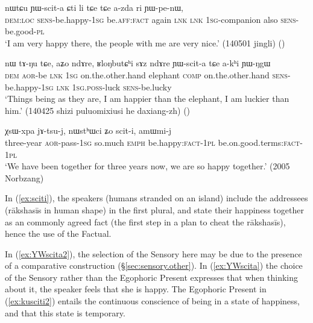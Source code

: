 \begin{exe}
\ex \label{ex:YWscita}
\gll nɯtɕu ɲɯ-scit-a ɕti li tɕe tɕe a-zda ri ɲɯ-pe-nɯ, \\
\textsc{dem}:\textsc{loc} \textsc{sens}-be.happy-\textsc{1sg} be.\textsc{aff}:\textsc{fact} again \textsc{lnk} \textsc{lnk} \textsc{1sg}-companion also \textsc{sens}-be.good-\textsc{pl} \\
\glt `I am very happy there, the people with me are very nice.' (140501 jingli) ()
\end{exe}
 
\begin{exe}
\ex \label{ex:YWscita2}
\gll nɯ tɤ-ŋu tɕe, aʑo ndɤre, ʁloŋbutɕʰi sɤz ndɤre ɲɯ-scit-a tɕe a-kʰi ɲɯ-ŋgɯ \\
\textsc{dem} \textsc{aor}-be \textsc{lnk} \textsc{1sg} on.the.other.hand elephant \textsc{comp} on.the.other.hand \textsc{sens}-be.happy-\textsc{1sg} \textsc{lnk} \textsc{1sg}.\textsc{poss}-luck \textsc{sens}-be.lucky \\
\glt `Things being as they are, I am happier than the elephant, I am luckier than him.' (140425 shizi puluomixiusi he daxiang-zh)
()
\end{exe}


\begin{exe}
\ex \label{ex:sciti}
\gll χsɯ-xpa jɤ-tsu-j, nɯstʰɯci ʑo scit-i, amɯmi-j  \\
three-year \textsc{aor}-pass-\textsc{1sg} so.much \textsc{emph} be.happy:\textsc{fact}-\textsc{1pl} be.on.good.terms:\textsc{fact}-\textsc{1pl} \\
\glt `We have been together for three years now, we are so happy together.' (2005 Norbzang)
\end{exe}

In (\ref{ex:sciti}), the speakers (humans stranded on an island) include the addressees (rākshasīs in human shape) in the first plural, and state their happiness together as an commonly agreed fact (the first step in a plan to cheat the rākshasīs), hence the use of the Factual. 

In (\ref{ex:YWscita2}), the selection of the Sensory here may be due to the presence of a comparative construction (§\ref{sec:sensory.other}). In (\ref{ex:YWscita}) the choice of the Sensory rather than the Egophoric Present expresses that when thinking about it, the speaker feels that she is happy. The Egophoric Present in (\ref{ex:kusciti2}) entails the continuous conscience of being in a state of happiness, and that this state is temporary.

